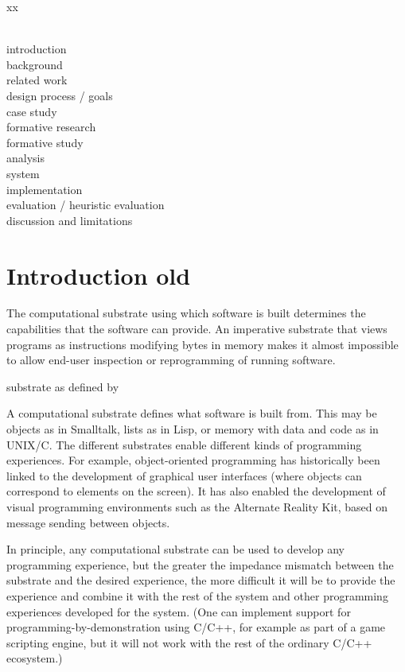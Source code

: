 \documentclass[sigconf,anonymous,screen]{acmart}
\begin{document}
\newpage
xx

~\\
introduction \\
background \\
related work \\
design process / goals \\
case study \\
formative research \\
formative study \\
analysis \\
system \\
implementation \\
evaluation / heuristic evaluation \\
discussion and limitations \\

\newpage

\section{Introduction old}

The computational substrate using which software is built determines the capabilities that the
software can provide. An imperative substrate that views programs as instructions modifying
bytes in memory makes it almost impossible to allow end-user inspection or reprogramming of
running software.

substrate as defined by \cite{jakubovic-2022-ladder}


A computational substrate defines what software is built from. This may be objects as in
Smalltalk, lists as in Lisp, or memory with data and code as in UNIX/C.
The different substrates enable different kinds of programming experiences.
For example, object-oriented programming has historically been linked to the development
of graphical user interfaces (where objects can correspond to elements on the screen).
It has also enabled the development of visual programming environments such as the Alternate
Reality Kit, based on message sending between objects.

In principle, any computational substrate can be used to develop any programming experience,
but the greater the impedance mismatch between the substrate and the desired experience,
the more difficult it will be to provide the experience and combine it with the rest of the
system and other programming experiences developed for the system. (One can implement support
for programming-by-demonstration using C/C++, for example as part of a game scripting engine,
but it will not work with the rest of the ordinary C/C++ ecosystem.)
\end{document}
